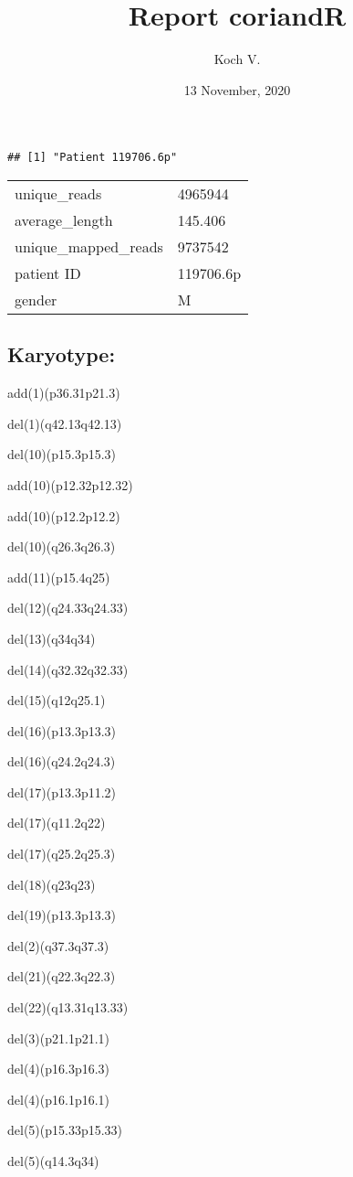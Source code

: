 \documentclass[]{article}
\title{Report coriandR}
\author{Koch V.}
\date{13 November, 2020}
\begin{document}
\maketitle

\begin{verbatim}
## [1] "Patient 119706.6p"
\end{verbatim}

\begin{longtable}[]{@{}ll@{}}
\toprule
\endhead
unique\_reads & 4965944\tabularnewline
average\_length & 145.406\tabularnewline
unique\_mapped\_reads & 9737542\tabularnewline
patient ID & 119706.6p\tabularnewline
gender & M\tabularnewline
\bottomrule
\end{longtable}

\hypertarget{karyotype}{%
\subsection{Karyotype:}\label{karyotype}}

add(1)(p36.31p21.3)

del(1)(q42.13q42.13)

del(10)(p15.3p15.3)

add(10)(p12.32p12.32)

add(10)(p12.2p12.2)

del(10)(q26.3q26.3)

add(11)(p15.4q25)

del(12)(q24.33q24.33)

del(13)(q34q34)

del(14)(q32.32q32.33)

del(15)(q12q25.1)

del(16)(p13.3p13.3)

del(16)(q24.2q24.3)

del(17)(p13.3p11.2)

del(17)(q11.2q22)

del(17)(q25.2q25.3)

del(18)(q23q23)

del(19)(p13.3p13.3)

del(2)(q37.3q37.3)

del(21)(q22.3q22.3)

del(22)(q13.31q13.33)

del(3)(p21.1p21.1)

del(4)(p16.3p16.3)

del(4)(p16.1p16.1)

del(5)(p15.33p15.33)

del(5)(q14.3q34)
\end{document}
